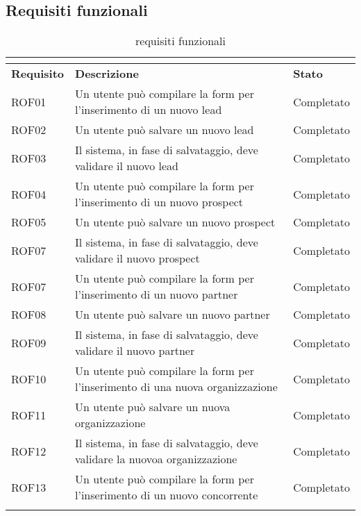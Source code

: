 \subsection*{Requisiti funzionali}
\begin{longtable}[h]{|p{2.5cm}|p{8cm}|p{2.5cm}|}
	\caption{requisiti funzionali}\\
	\label{tab:requisiti-funzionali}\\
	\hline
	\rule[-4mm]{0mm}{1cm}	
	\textbf{Requisito} & \textbf{Descrizione} & \textbf{Stato}\\
	\hline
	\rule[-3mm]{0mm}{0.8cm}	
	ROF01&Un utente può compilare la form per l'inserimento di un nuovo lead&Completato\\
	\hline
	\rule[-3mm]{0mm}{0.8cm}
	ROF02&Un utente può salvare un nuovo lead&Completato\\
	\hline
	\rule[-3mm]{0mm}{0.8cm}
	ROF03&Il sistema, in fase di salvataggio, deve validare il nuovo lead &Completato\\
	\hline
	\rule[-3mm]{0mm}{0.8cm}
	ROF04&Un utente può compilare la form per l'inserimento di un nuovo prospect &Completato\\
	\hline
	\rule[-3mm]{0mm}{0.8cm}
	ROF05&Un utente può salvare un nuovo prospect&Completato\\
	\hline
	\rule[-3mm]{0mm}{0.8cm}
	ROF07&Il sistema, in fase di salvataggio, deve validare il nuovo prospect&Completato \\
	\hline
	\rule[-3mm]{0mm}{0.8cm}
	ROF07&Un utente può compilare la form per l'inserimento di un nuovo partner  & Completato\\
	\hline
	\rule[-3mm]{0mm}{0.8cm}
	ROF08&Un utente può salvare un nuovo partner&Completato\\
	\hline
	\rule[-3mm]{0mm}{0.8cm}
	ROF09&Il sistema, in fase di salvataggio, deve validare il nuovo partner&Completato \\
	\hline
	\rule[-3mm]{0mm}{0.8cm}
	ROF10&Un utente può compilare la form per l'inserimento di una nuova organizzazione  & Completato\\
	\hline
	\rule[-3mm]{0mm}{0.8cm}
	ROF11&Un utente può salvare un nuova organizzazione&Completato\\
	\hline
	\rule[-3mm]{0mm}{0.8cm}
	ROF12&Il sistema, in fase di salvataggio, deve validare la nuovoa organizzazione&Completato \\
	\hline
	\rule[-3mm]{0mm}{0.8cm}
	ROF13&Un utente può compilare la form per l'inserimento di un nuovo concorrente  & Completato\\
	\hline
	\rule[-3mm]{0mm}{0.8cm}

\end{longtable}
